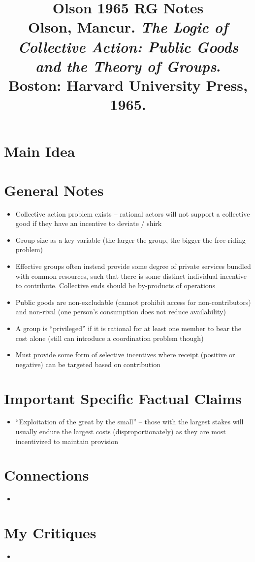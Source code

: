 \documentclass[12pt]{article}
\title{\textbf{Olson 1965 RG Notes}\\
\large Olson, Mancur. \textit{The Logic of Collective Action: Public Goods and the Theory of Groups}.\\
Boston: Harvard University Press, 1965.}
\author{}
\date{}
\begin{document}
\maketitle

\section{Main Idea}



\section{General Notes}

\begin{itemize}[leftmargin=*, itemsep=4pt]
    \item Collective action problem exists -- rational actors will not support a collective good if they have an incentive to deviate / shirk
    \item Group size as a key variable (the larger the group, the bigger the free-riding problem)
    \item Effective groups often instead provide some degree of private services bundled with common resources, such that there is some distinct individual incentive to contribute. Collective ends should be by-products of operations
    \item Public goods are non-excludable (cannot prohibit access for non-contributors) and non-rival (one person's consumption does not reduce availability)
    \item A group is ``privileged'' if it is rational for at least one member to bear the cost alone (still can introduce a coordination problem though)
    \item Must provide some form of selective incentives where receipt (positive or negative) can be targeted based on contribution
\end{itemize}


\section{Important Specific Factual Claims}

\begin{itemize}[leftmargin=*, itemsep=4pt]
    \item ``Exploitation of the great by the small'' -- those with the largest stakes will usually endure the largest costs (disproportionately) as they are most incentivized to maintain provision
\end{itemize}


\section{Connections}

\begin{itemize}[leftmargin=*, itemsep=4pt]
    \item
\end{itemize}


\section{My Critiques}

\begin{itemize}[leftmargin=*, itemsep=4pt]
    \item
\end{itemize}
\end{document}
